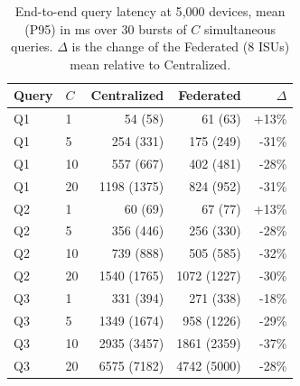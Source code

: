 \begin{table}[t]
\centering
\caption{End-to-end query latency at 5{,}000 devices, mean (P95) in ms over 30 bursts of $C$ simultaneous queries. $\Delta$ is the change of the Federated (8 ISUs) mean relative to Centralized.}
\label{tab:query-exp2}
\begin{tabular}{llrrr}
\toprule
Query & $C$ & Centralized & Federated & $\Delta$ \\
\midrule
Q1 & 1 & 54 (58) & 61 (63) & +13\% \\
Q1 & 5 & 254 (331) & 175 (249) & -31\% \\
Q1 & 10 & 557 (667) & 402 (481) & -28\% \\
Q1 & 20 & 1198 (1375) & 824 (952) & -31\% \\
\midrule
Q2 & 1 & 60 (69) & 67 (77) & +13\% \\
Q2 & 5 & 356 (446) & 256 (330) & -28\% \\
Q2 & 10 & 739 (888) & 505 (585) & -32\% \\
Q2 & 20 & 1540 (1765) & 1072 (1227) & -30\% \\
\midrule
Q3 & 1 & 331 (394) & 271 (338) & -18\% \\
Q3 & 5 & 1349 (1674) & 958 (1226) & -29\% \\
Q3 & 10 & 2935 (3457) & 1861 (2359) & -37\% \\
Q3 & 20 & 6575 (7182) & 4742 (5000) & -28\% \\
\bottomrule
\end{tabular}
\end{table}
